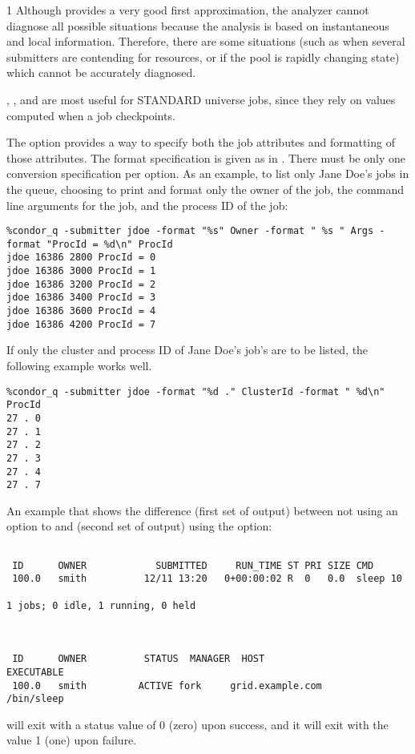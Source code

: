 \begin{ManPage}{\label{man-condor-q}}{1}
\GenRem
Although  provides a very good first approximation, the analyzer 
cannot diagnose all possible situations because the analysis is based on 
instantaneous and local information.  Therefore, there are some situations 
(such as when several submitters are contending for resources, or if the pool 
is rapidly changing state) which cannot be accurately diagnosed.

, , and  are most useful for STANDARD
universe jobs, since they rely on values computed when a job
checkpoints.

\Examples

The  option provides a way to specify both the job attributes
and formatting of those attributes.
The format specification is given as in .
There must be only one conversion specification per  option.
As an example, to list only Jane Doe's jobs in the queue,
choosing to print and format only the owner of the job,
the command line arguments for the job, and the
process ID of the job:
\begin{verbatim}
%condor_q -submitter jdoe -format "%s" Owner -format " %s " Args -format "ProcId = %d\n" ProcId
jdoe 16386 2800 ProcId = 0
jdoe 16386 3000 ProcId = 1
jdoe 16386 3200 ProcId = 2
jdoe 16386 3400 ProcId = 3
jdoe 16386 3600 ProcId = 4
jdoe 16386 4200 ProcId = 7
\end{verbatim}

If only the cluster and process ID of Jane Doe's job's are to
be listed, the following example works well.
\begin{verbatim}
%condor_q -submitter jdoe -format "%d ." ClusterId -format " %d\n" ProcId
27 . 0
27 . 1
27 . 2
27 . 3
27 . 4
27 . 7
\end{verbatim}

An example that shows the difference (first set of output)
between not using an option to  and (second
set of output) using the  option:
\begin{verbatim}

 ID      OWNER            SUBMITTED     RUN_TIME ST PRI SIZE CMD
 100.0   smith          12/11 13:20   0+00:00:02 R  0   0.0  sleep 10

1 jobs; 0 idle, 1 running, 0 held



 ID      OWNER          STATUS  MANAGER  HOST                EXECUTABLE
 100.0   smith         ACTIVE fork     grid.example.com       /bin/sleep
\end{verbatim}

\ExitStatus

 will exit with a status value of 0 (zero) upon success,
and it will exit with the value 1 (one) upon failure.

\end{ManPage}
